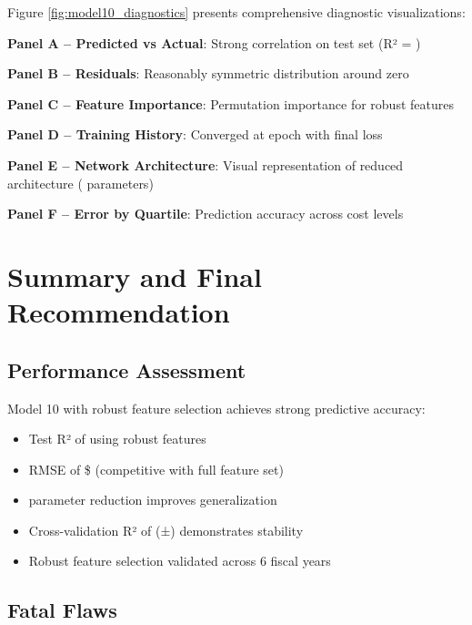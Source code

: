 Figure \ref{fig:model10_diagnostics} presents comprehensive diagnostic visualizations:

\textbf{Panel A -- Predicted vs Actual}: Strong correlation on test set (R² = \ModelTenRSquaredTest{})

\textbf{Panel B -- Residuals}: Reasonably symmetric distribution around zero

\textbf{Panel C -- Feature Importance}: Permutation importance for \ModelTenRobustFeatures{} robust features

\textbf{Panel D -- Training History}: Converged at epoch \ModelTenEpochsStopped{} with final loss \ModelTenTrainingLoss{}

\textbf{Panel E -- Network Architecture}: Visual representation of reduced architecture (\ModelTenTotalParams{} parameters)

\textbf{Panel F -- Error by Quartile}: Prediction accuracy across cost levels

\section{Summary and Final Recommendation}

\subsection{Performance Assessment}

Model 10 with robust feature selection achieves strong predictive accuracy:
\begin{itemize}
    \item Test R² of \ModelTenRSquaredTest{} using \ModelTenRobustFeatures{} robust features
    \item RMSE of \$\ModelTenRMSETest{} (competitive with full feature set)
    \item \ModelTenParameterReduction{} parameter reduction improves generalization
    \item Cross-validation R² of \ModelTenCVMean{} (±\ModelTenCVStd{}) demonstrates stability
    \item Robust feature selection validated across 6 fiscal years
\end{itemize}

\subsection{Fatal Flaws}


